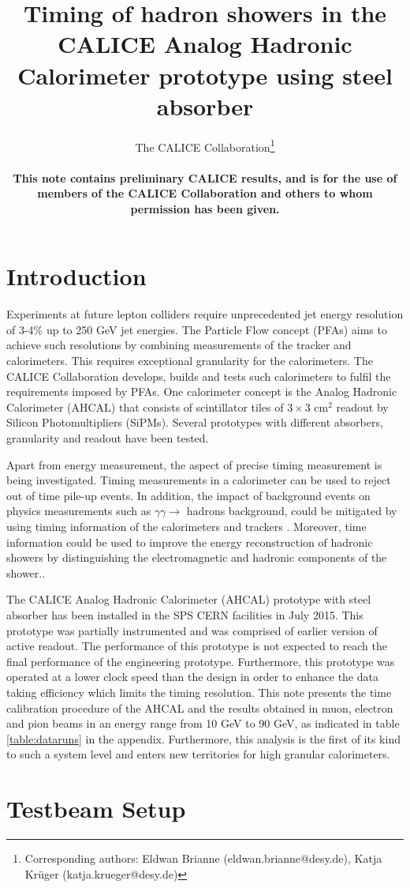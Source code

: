 \documentclass{JINST}
\title{Timing of hadron showers in the CALICE Analog Hadronic Calorimeter prototype using steel absorber}
\author{The CALICE Collaboration\thanks{Corresponding authors: Eldwan Brianne (eldwan.brianne@desy.de), Katja Kr\"uger (katja.krueger@desy.de) } \\
\vspace{10 mm}

{\rm \bf \normalsize This note contains preliminary CALICE results, and is for the use of members of the CALICE Collaboration and others to whom permission has been given.}
}
\begin{document}
\section{Introduction}

Experiments at future lepton colliders require unprecedented jet energy resolution of 3-4\% up to 250 GeV jet energies. The Particle Flow concept (PFAs) \cite{Thomson:2009rp} aims to achieve such resolutions by combining measurements of the tracker and calorimeters. This requires exceptional granularity for the calorimeters. The CALICE Collaboration develops, builds and tests such calorimeters to fulfil the requirements imposed by PFAs. One calorimeter concept is the Analog Hadronic Calorimeter (AHCAL) that consists of scintillator tiles of $3\times3$ cm$^2$ readout by Silicon Photomultipliers (SiPMs). Several prototypes with different absorbers, granularity and readout have been tested.

Apart from energy measurement, the aspect of precise timing measurement is being investigated. Timing measurements in a calorimeter can be used to reject out of time pile-up events. In addition, the impact of background events on physics measurements such as $\gamma\gamma \rightarrow$ hadrons background, could be mitigated by using timing information of the calorimeters and trackers \cite{Barklow:2016tza}. Moreover, time information could be used to improve the energy reconstruction of hadronic showers by distinguishing the electromagnetic and hadronic components of the shower.\cite{Benaglia2016}.

The CALICE Analog Hadronic Calorimeter (AHCAL) prototype \cite{Sefkow:316196, Krueger:205287} with steel absorber has been installed in the SPS CERN facilities in July 2015. This prototype was partially instrumented and was comprised of earlier version of active readout. The performance of this prototype is not expected to reach the final performance of the engineering prototype. Furthermore, this prototype was operated at a lower clock speed than the design in order to enhance the data taking efficiency which limits the timing resolution. This note presents the time calibration procedure of the AHCAL and the results obtained in muon, electron and pion beams in an energy range from 10 GeV to 90 GeV, as indicated in table \ref{table:dataruns} in the appendix. Furthermore, this analysis is the first of its kind to such a system level and enters new territories for high granular calorimeters.

\section{Testbeam Setup}
\end{document}
